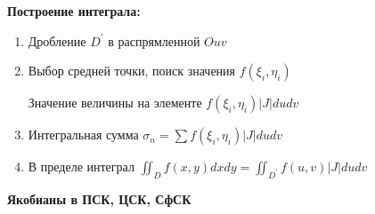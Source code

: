 \documentclass[12pt]{article}
\begin{document}
    \vspace{5mm}

    \textbf{Построение интеграла:}
    \begin{enumerate}
        \item Дробление $D^\prime$ в распрямленной $Ouv$
        \item Выбор средней точки, поиск значения $f(\xi_i, \eta_i)$

        Значение величины на элементе $f(\xi_i, \eta_i) |J| du dv$
        \item Интегральная сумма $\sigma_n = \sum f(\xi_i, \eta_i) |J| du dv$
        \item В пределе интеграл $\iint_D f(x, y) dx dy = \iint_{D^\prime} f(u, v) |J| du dv$
    \end{enumerate}

    \vspace{5mm}

    \textbf{Якобианы в ПСК, ЦСК, СфСК}
\end{document}
